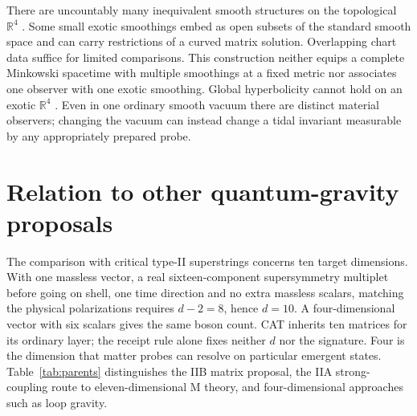 There are uncountably many inequivalent smooth structures on the topological \(\mathbb R^4\) \cite{demichelis}. Some small exotic smoothings embed as open subsets of the standard smooth space and can carry restrictions of a curved matrix solution. Overlapping chart data suffice for limited comparisons. This construction neither equips a complete Minkowski spacetime with multiple smoothings at a fixed metric nor associates one observer with one exotic smoothing. Global hyperbolicity cannot hold on an exotic \(\mathbb R^4\) \cite{cher}. Even in one ordinary smooth vacuum there are distinct material observers; changing the vacuum can instead change a tidal invariant measurable by any appropriately prepared probe.

\section{Relation to other quantum-gravity proposals}\label{sec:comparisons}
The comparison with critical type-II superstrings concerns ten target dimensions. With one massless vector, a real sixteen-component supersymmetry multiplet before going on shell, one time direction and no extra massless scalars, matching the physical polarizations requires \(d-2=8\), hence \(d=10\). A four-dimensional vector with six scalars gives the same boson count. CAT inherits ten matrices for its ordinary layer; the receipt rule alone fixes neither \(d\) nor the signature. Four is the dimension that matter probes can resolve on particular emergent states. Table~\ref{tab:parents} distinguishes the IIB matrix proposal, the IIA strong-coupling route to eleven-dimensional M theory, and four-dimensional approaches such as loop gravity.

